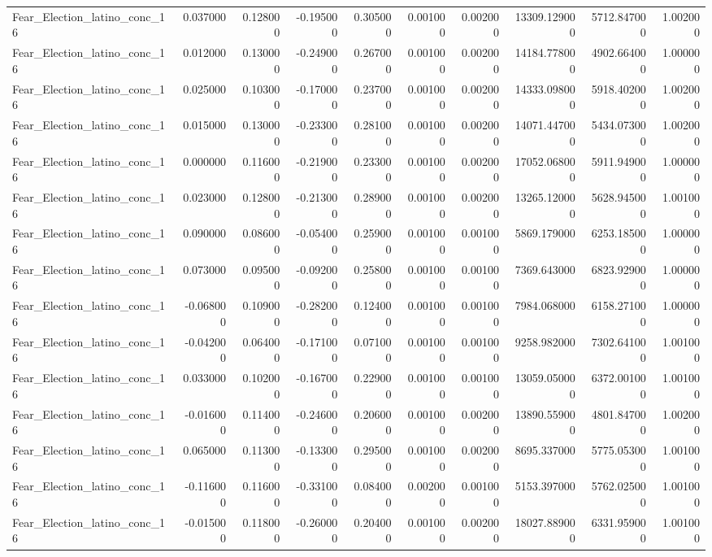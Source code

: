 \begin{table}
\begin{tabular}{lrrrrrrrrr}
Fear_Election_latino_conc_16 & 0.037000 & 0.128000 & -0.195000 & 0.305000 & 0.001000 & 0.002000 & 13309.129000 & 5712.847000 & 1.002000 \\
Fear_Election_latino_conc_16 & 0.012000 & 0.130000 & -0.249000 & 0.267000 & 0.001000 & 0.002000 & 14184.778000 & 4902.664000 & 1.000000 \\
Fear_Election_latino_conc_16 & 0.025000 & 0.103000 & -0.170000 & 0.237000 & 0.001000 & 0.002000 & 14333.098000 & 5918.402000 & 1.002000 \\
Fear_Election_latino_conc_16 & 0.015000 & 0.130000 & -0.233000 & 0.281000 & 0.001000 & 0.002000 & 14071.447000 & 5434.073000 & 1.002000 \\
Fear_Election_latino_conc_16 & 0.000000 & 0.116000 & -0.219000 & 0.233000 & 0.001000 & 0.002000 & 17052.068000 & 5911.949000 & 1.000000 \\
Fear_Election_latino_conc_16 & 0.023000 & 0.128000 & -0.213000 & 0.289000 & 0.001000 & 0.002000 & 13265.120000 & 5628.945000 & 1.001000 \\
Fear_Election_latino_conc_16 & 0.090000 & 0.086000 & -0.054000 & 0.259000 & 0.001000 & 0.001000 & 5869.179000 & 6253.185000 & 1.000000 \\
Fear_Election_latino_conc_16 & 0.073000 & 0.095000 & -0.092000 & 0.258000 & 0.001000 & 0.001000 & 7369.643000 & 6823.929000 & 1.000000 \\
Fear_Election_latino_conc_16 & -0.068000 & 0.109000 & -0.282000 & 0.124000 & 0.001000 & 0.001000 & 7984.068000 & 6158.271000 & 1.000000 \\
Fear_Election_latino_conc_16 & -0.042000 & 0.064000 & -0.171000 & 0.071000 & 0.001000 & 0.001000 & 9258.982000 & 7302.641000 & 1.001000 \\
Fear_Election_latino_conc_16 & 0.033000 & 0.102000 & -0.167000 & 0.229000 & 0.001000 & 0.001000 & 13059.050000 & 6372.001000 & 1.001000 \\
Fear_Election_latino_conc_16 & -0.016000 & 0.114000 & -0.246000 & 0.206000 & 0.001000 & 0.002000 & 13890.559000 & 4801.847000 & 1.002000 \\
Fear_Election_latino_conc_16 & 0.065000 & 0.113000 & -0.133000 & 0.295000 & 0.001000 & 0.002000 & 8695.337000 & 5775.053000 & 1.001000 \\
Fear_Election_latino_conc_16 & -0.116000 & 0.116000 & -0.331000 & 0.084000 & 0.002000 & 0.001000 & 5153.397000 & 5762.025000 & 1.001000 \\
Fear_Election_latino_conc_16 & -0.015000 & 0.118000 & -0.260000 & 0.204000 & 0.001000 & 0.002000 & 18027.889000 & 6331.959000 & 1.001000 \\

\end{tabular}
\end{table}
